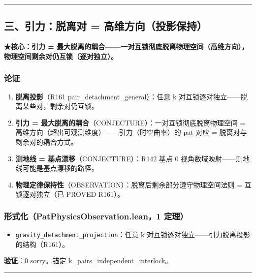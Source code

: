 \documentclass[
]{article}
\providecommand{\tightlist}{%
  \setlength{\itemsep}{0pt}\setlength{\parskip}{0pt}}
\begin{document}
\begin{center}\rule{0.5\linewidth}{0.5pt}\end{center}

\subsection{三、引力：脱离对 =
高维方向（投影保持）}\label{ux4e09ux5f15ux529bux8131ux79bbux5bf9-ux9ad8ux7ef4ux65b9ux5411ux6295ux5f71ux4fddux6301}

\textbf{★核心：引力 =
最大脱离的耦合------一对互锁彻底脱离物理空间（高维方向），物理空间剩余对仍互锁（逐对独立）。}

\subsubsection{论证}\label{ux8bbaux8bc1-2}

\begin{enumerate}
\def\labelenumi{\arabic{enumi}.}
\tightlist
\item
  \textbf{脱离投影}（R161 pair\_detachment\_general）：任意 k
  对互锁逐对独立------脱离某些对，剩余对仍互锁。
\item
  \textbf{引力 = 最大脱离的耦合}（CONJECTURE）：一对互锁彻底脱离物理空间
  = 高维方向（超出可观测维度）------引力（时空曲率）的 pat 对应 =
  脱离对与剩余对的耦合方式。
\item
  \textbf{测地线 = 基点漂移}（CONJECTURE）：R142 基点 0
  视角数域映射------测地线可能是基点漂移的路径。
\item
  \textbf{物理定律保持性}（OBSERVATION）：脱离后剩余部分遵守物理空间法则
  = 互锁逐对独立（已 PROVED R161）。
\end{enumerate}

\subsubsection{形式化（PatPhysicsObservation.lean，1
定理）}\label{ux5f62ux5f0fux5316patphysicsobservation.lean1-ux5b9aux7406-1}

\begin{itemize}
\tightlist
\item
  \texttt{gravity\_detachment\_projection}：任意 k
  对互锁逐对独立------引力脱离投影的结构（R161）。
\end{itemize}

\textbf{验证}：0 sorry。锚定 k\_pairs\_independent\_interlock。

\begin{center}\rule{0.5\linewidth}{0.5pt}\end{center}
\end{document}
